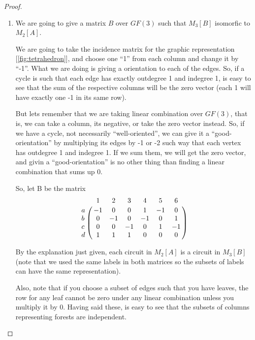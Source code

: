 \begin{proof}
\begin{enumerate}[label=(\roman*)]
        \item\label{t1:p1iii}
            We are going to give a matrix $B$ over $GF(3)$ such that $M_3[B]$ isomorfic to $M_2[A]$.\pn
            
            We are going to take the incidence matrix for the graphic representation [\ref{fig:tetrahedron}], and
            choose one ``1'' from each column and change it by ``-1''. What we are doing is giving a orientation
            to each of the edges. So, if a cycle is such that each edge has exactly outdegree 1 and indegree 1, is
            easy to see that the sum of the respective columns will be the zero vector (each 1 will have exactly one -1 in
            its same row).\pn
            
            But lets remember that we are taking linear combination over $GF(3)$, that is, we can take a column, 
            its negative, or take the zero vector instead. So, if we have a cycle, not necessarily ``well-oriented'',
            we can give it a ``good-orientation'' by multiplying its edges by -1 or -2 such way that each vertex 
            has outdegree 1 and indegree 1. If we sum them, we will get the zero vector, and givin a ``good-orientation'' is
            no other thing than finding a linear combination that sums up 0.\pn
            
            So, let B be the matrix
            $$\bordermatrix{
                    &   1   &   2   &   3   &   4   &   5   &   6   \cr
                a   &   -1  &   0   &   0   &   1   &   -1  &   0   \cr
                b   &   0   &   -1  &   0   &   -1  &   0   &   1   \cr
                c   &   0   &   0   &   -1  &   0   &   1   &   -1  \cr
                d   &   1   &   1   &   1   &   0   &   0   &   0   \cr
            }$$
            
            By the explanation just given, each circuit in $M_2[A]$ is a circuit in $M_3[B]$ (note that we used the same 
            labels in both matrices so the subsets of labels can have the same representation).\pn
            
            Also, note that if you choose a subset of edges such that you have leaves, the row for any leaf cannot be
            zero under any linear combination unless you multiply it by 0. Having said these, is easy to see that
            the subsets of columns representing forests are independent.\pn
            

\end{enumerate}
\end{proof}
